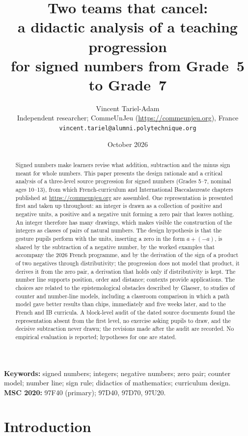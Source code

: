 \documentclass[11pt,a4paper]{article}
\title{Two teams that cancel:\\ a didactic analysis of a teaching progression\\ for signed numbers from Grade~5 to Grade~7}
\author{Vincent Tariel-Adam\\[2pt]
  \small Independent researcher; CommeUnJeu (\url{https://commeunjeu.org}), France\\
  \small \texttt{vincent.tariel@alumni.polytechnique.org}}
\date{October 2026}
\theoremstyle{definition}
\begin{document}
\maketitle

\begin{abstract}
\noindent
Signed numbers make learners revise what addition, subtraction and the minus sign meant for whole numbers. This paper presents the design rationale and a critical analysis of a three-level source progression for signed numbers (Grades 5--7, nominal ages 10--13), from which French-curriculum and International Baccalaureate chapters published at \url{https://commeunjeu.org} are assembled. One representation is presented first and taken up throughout: an integer is drawn as a collection of positive and negative units, a positive and a negative unit forming a zero pair that leaves nothing. An integer therefore has many drawings, which makes visible the construction of the integers as classes of pairs of natural numbers. The design hypothesis is that the gesture pupils perform with the units, inserting a zero in the form $a+(-a)$, is shared by the subtraction of a negative number, by the worked examples that accompany the 2026 French programme, and by the derivation of the sign of a product of two negatives through distributivity; the progression does not model that product, it derives it from the zero pair, a derivation that holds only if distributivity is kept. The number line supports position, order and distance; contexts provide applications. The choices are related to the epistemological obstacles described by Glaeser, to studies of counter and number-line models, including a classroom comparison in which a path model gave better results than chips, immediately and five weeks later, and to the French and IB curricula. A block-level audit of the dated source documents found the representation absent from the first level, no exercise asking pupils to draw, and the decisive subtraction never drawn; the revisions made after the audit are recorded. No empirical evaluation is reported; hypotheses for one are stated.
\end{abstract}

\noindent\textbf{Keywords:} signed numbers; integers; negative numbers; zero pair; counter model; number line; sign rule; didactics of mathematics; curriculum design.\\
\textbf{MSC 2020:} 97F40 (primary); 97D40, 97D70, 97U20.

\section{Introduction}\label{sec:intro}
\end{document}
